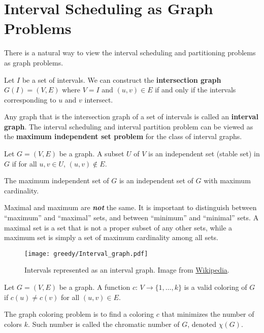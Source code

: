 \section{Interval Scheduling as Graph Problems}

There is a natural way to view the interval scheduling and partitioning problems as graph problems.

 
Let $I$ be a set of intervals. We can construct the \textbf{intersection graph} $G(I) = (V,E)$ where $V=I$ and $(u,v) \in E$ if and only if the intervals corresponding to $u$ and $v$ intersect.

Any graph that is the intersection graph of a set of intervals is called an \textbf{interval graph}. The interval scheduling and interval partition problem can be viewed as the \textbf{maximum independent set problem} for the class of interval graphs.

\begin{definition}
    Let $G=(V,E)$ be a graph. A subset $U$ of $V$ is an independent set (stable set) in $G$ if for all $u,v \in U$, $(u,v) \not\in E$.

    The maximum independent set of $G$ is an independent set of $G$ with maximum cardinality.
\end{definition}

\begin{pitfall}
    Maximal and maximum are \textit{\textbf{not}} the same. It is important to distinguish between ``maximum'' and ``maximal'' sets, and between ``minimum'' and ``minimal'' sets. A maximal set is a set that is not a proper subset of any other sets, while a maximum set is simply a set of maximum cardinality among all sets.
\end{pitfall}

\begin{figure}[htbp]
    \centering
    \texttt{[image: greedy/Interval\_graph.pdf]}
    \caption{Intervals represented as an interval graph. Image from \href{https://en.wikipedia.org/wiki/Interval_graph}{Wikipedia}.}
    \label{fig:greedy-interval-graph}
\end{figure}

\begin{definition}
    Let $G=(V,E)$ be a graph. A function $c:\, V \to \{1,\ldots,k\}$ is a valid coloring of $G$ if $c(u) \neq c(v)$ for all $(u,v) \in E$.

    The graph coloring problem is to find a coloring $c$ that minimizes the number of colors $k$. Such number is called the chromatic number of $G$, denoted $\chi(G)$.
\end{definition}


